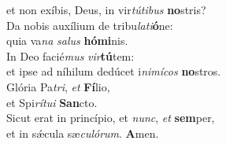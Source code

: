 \evenverse et non exíbis, Deus, in vir\textit{tú}\textit{ti}\textit{bus} \textbf{no}stris?\\
\oddverse Da nobis auxílium de tribu\textit{la}\textit{ti}\textbf{ó}ne:~\*\\
\oddverse quia va\textit{na} \textit{sa}\textit{lus} \textbf{hó}\textbf{mi}nis.\\
\evenverse In Deo facié\textit{mus} \textit{vir}\textbf{tú}tem:~\*\\
\evenverse et ipse ad níhilum dedúcet i\textit{ni}\textit{mí}\textit{cos} \textbf{no}stros.\\
\oddverse Glória Pa\textit{tri}, \textit{et} \textbf{Fí}lio,~\*\\
\oddverse et Spi\textit{rí}\textit{tu}\textit{i} \textbf{San}cto.\\
\evenverse Sicut erat in princípio, et \textit{nunc}, \textit{et} \textbf{sem}per,~\*\\
\evenverse et in sǽcula sæ\textit{cu}\textit{ló}\textit{rum}. \textbf{A}men.\\

